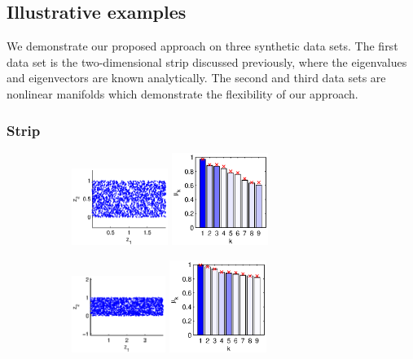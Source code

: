 \documentclass[3p]{elsarticle}
\begin{document}
\subsection{Illustrative examples} \label{sec:illustrative_examples}

We demonstrate our proposed approach on three synthetic data sets. 
%
The first data set is the two-dimensional strip discussed previously, where the eigenvalues and eigenvectors are known analytically.
%
The second and third data sets are nonlinear manifolds which demonstrate the flexibility of our approach. 

\subsubsection{Strip}

\begin{figure}[!t]
\centering
\begin{subfigure}{0.25\textwidth}
\includegraphics[height=2.5cm]{strip_data_L2}
\includegraphics[height=3cm]{strip_spectrum_L2}
\caption{}
\end{subfigure}
%
%
\begin{subfigure}{0.25\textwidth}
\includegraphics[height=2.5cm]{strip_data_L4}
\includegraphics[height=3cm]{strip_spectrum_L4}
\caption{}

\end{subfigure}
\end{figure}
\end{document}
